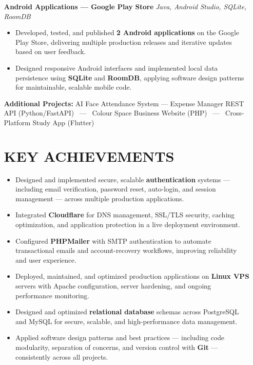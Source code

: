 \documentclass[10.5pt,a4paper]{article}
\newcommand{\role}[2]{\textbf{#1} \hfill \textit{#2}}
\begin{document}
\role{Android Applications — Google Play Store}{Java, Android Studio, SQLite, RoomDB}
\begin{itemize}
\item Developed, tested, and published \textbf{2 Android applications} on the Google Play Store, delivering multiple production releases and iterative updates based on user feedback.
\item Designed responsive Android interfaces and implemented local data persistence using \textbf{SQLite} and \textbf{RoomDB}, applying software design patterns for maintainable, scalable mobile code.
\end{itemize}

\textbf{Additional Projects:} AI Face Attendance System — Expense Manager REST API (Python/FastAPI) \ — \ Colour Space Business Website (PHP) \ — \ Cross-Platform Study App (Flutter)

\section*{KEY ACHIEVEMENTS}
\begin{itemize}
\item Designed and implemented secure, scalable \textbf{authentication} systems — including email verification, password reset, auto-login, and session management — across multiple production applications.
\item Integrated \textbf{Cloudflare} for DNS management, SSL/TLS security, caching optimization, and application protection in a live deployment environment.
\item Configured \textbf{PHPMailer} with SMTP authentication to automate transactional emails and account-recovery workflows, improving reliability and user experience.
\item Deployed, maintained, and optimized production applications on \textbf{Linux VPS} servers with Apache configuration, server hardening, and ongoing performance monitoring.
\item Designed and optimized \textbf{relational database} schemas across PostgreSQL and MySQL for secure, scalable, and high-performance data management.
\item Applied software design patterns and best practices — including code modularity, separation of concerns, and version control with \textbf{Git} — consistently across all projects.
\end{itemize}
\end{document}
